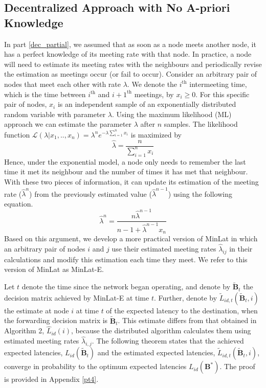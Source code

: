 \documentclass[journal,onecolumn,11pt]{IEEEtran}
\theoremstyle{plain}
\theoremstyle{definition}
\begin{document}
\subsection{Decentralized Approach with No A-priori Knowledge}\label{est}
In part \ref{dec_partial}, we assumed that as soon as a node meets
another node, it has a perfect knowledge of its meeting rate with that
node. In practice, a node will need to estimate its meeting rates with
the neighbours and periodically revise the estimation as meetings
occur (or fail to occur).
Consider an arbitrary pair of nodes that meet each other with rate
$\lambda$. We denote the $i^{\text{th}}$ intermeeting time, which is
the time between $i^{\text{th}}$ and ${i+1}^{\text{th}}$ meetings, by
$x_i \geq 0$. For this specific pair of nodes, $x_i$ is an independent
sample of an exponentially distributed random variable with parameter
$\lambda$. Using the maximum likelihood (ML) approach we can estimate the
parameter $\lambda$ after $n$ samples. The
likelihood function $\mathcal{L}(\lambda|x_1,..,x_n)=\lambda^n e^{-\lambda \sum_{i=1}^n x_i}$ is maximized by 
\begin{equation}
\widehat{\lambda}=\frac{n}{\sum_{i=1}^n x_i}
\end{equation}
Hence, under the exponential model, a node only needs to remember the
last time it met its neighbour and the number of times it has met that
neighbour. With these two pieces of information, it can update its
estimation of the meeting rate ($\widehat{\lambda}^{n}$) from the previously estimated value ($\widehat{\lambda}^{n-1}$) using the following equation.
\begin{equation} \label{estimation}
\widehat{\lambda}^{n}=\frac{n \widehat{\lambda}^{n-1}}{n-1+\widehat{\lambda}^{n-1}x_n}
\end{equation}
Based on this argument, we develop a more practical version of MinLat
in which an arbitrary pair of nodes $i$ and $j$ use their estimated
meeting rates $\widehat{\lambda}_{ij}$ in their calculations and
modify this estimation each time they meet. We refer to this version
of MinLat as MinLat-E.

Let $t$ denote the time since the network began operating, and denote
by $\widetilde{\mathbf{B}}_t$ the decision matrix achieved by MinLat-E
at time $t$. Further, denote by
$\widetilde{L}_{id,t}(\widetilde{\mathbf{B}}_t,i)$ the estimate at
node $i$ at time $t$ of the expected latency to the destination, when
the forwarding decision matrix is $\widetilde{\mathbf{B}}_t$. This
estimate differs from that obtained in Algorithm 2,
$\widehat{L}_{id}(i)$, because the distributed algorithm calculates
them using estimated meeting rates $\widehat{\lambda}_{i,j}$. The
following theorem states that the achieved expected latencies,
$L_{id}(\widetilde{\mathbf{B}}_t)$ and the estimated expected
latencies, $\widetilde{L}_{id,t}(\widetilde{\mathbf{B}}_t,i)$, converge in probability to the
optimum expected latencies $L_{id}(\mathbf{B}^*)$. The proof is
provided in Appendix \ref{pt4}.
\end{document}
